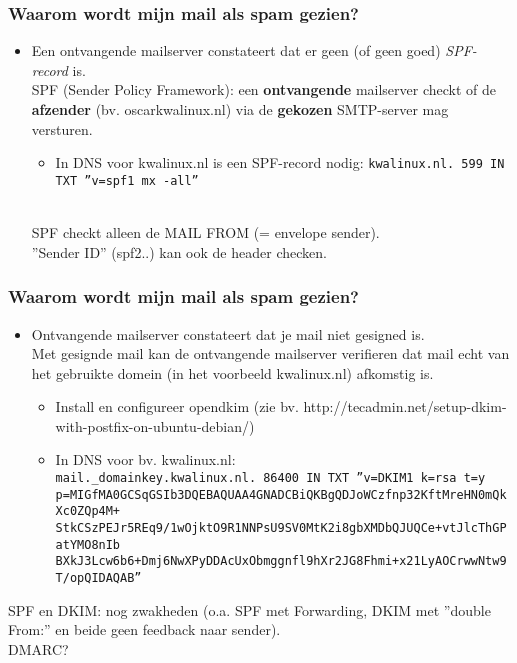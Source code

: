 \begin{frame}
	\frametitle{Waarom wordt mijn mail als spam gezien?}
\begin{itemize}
\item Een ontvangende mailserver constateert dat er geen (of geen goed) {\it SPF-record} is.\\
\pause
SPF (Sender Policy Framework): een {\bf ontvangende} mailserver checkt of de {\bf afzender} (bv. oscar{\myat}kwalinux.nl) via de {\bf gekozen} SMTP-server mag versturen.
    \begin{itemize}
	\pause
    \item In DNS voor kwalinux.nl is een SPF-record nodig:
    {\tt kwalinux.nl.            599     IN      TXT     ''v=spf1 mx -all''}
	\end{itemize}
\pause
~\\
SPF checkt alleen de MAIL FROM (= envelope sender).\\
''Sender ID'' (spf2..) kan ook de header checken.
\end{itemize}
\end{frame}

\begin{frame}
	\frametitle{Waarom wordt mijn mail als spam gezien?}
\begin{itemize}
\item Ontvangende mailserver constateert dat je mail niet gesigned is.\\
\pause
Met gesignde mail kan de ontvangende mailserver verifieren dat mail echt van het gebruikte domein (in het voorbeeld kwalinux.nl) afkomstig is. 
	\pause
	\begin{itemize}
    \item Install en configureer opendkim (zie bv. http://tecadmin.net/setup-dkim-with-postfix-on-ubuntu-debian/)
	\pause
    \item In DNS voor bv. kwalinux.nl:\\
	{\tiny
	{\tt mail.\_domainkey.kwalinux.nl. 86400 IN   TXT     ''v=DKIM1\; k=rsa\; t=y\;
p=MIGfMA0GCSqGSIb3DQEBAQUAA4GNADCBiQKBgQDJoWCzfnp32KftMreHN0mQkXc0ZQp4M+
StkCSzPEJr5REq9/1wOjktO9R1NNPsU9SV0MtK2i8gbXMDbQJUQCe+vtJlcThGPatYMO8nIb
BXkJ3Lcw6b6+Dmj6NwXPyDDAcUxObmggnfl9hXr2JG8Fhmi+x21LyAOCrwwNtw9T/opQIDAQAB''}}
	\end{itemize}
\end{itemize}
SPF en DKIM: nog zwakheden (o.a. SPF met Forwarding, DKIM met ''double From:'' en beide geen feedback naar sender).\\
\pause
DMARC?
\end{frame}


